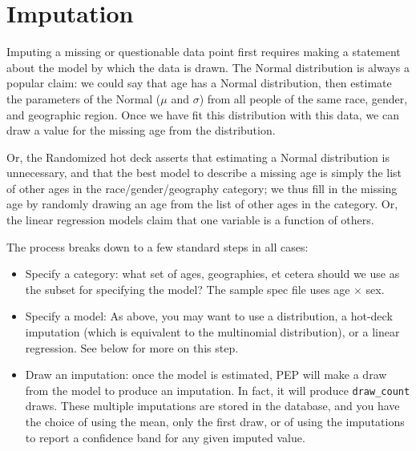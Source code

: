 \documentclass{article}
\begin{document}
\section{Imputation}
Imputing a missing or questionable data point first requires making a statement about
the model by which the data is drawn. The Normal distribution is always a popular claim:
we could say that age has a Normal distribution, then estimate the parameters of the
Normal ($\mu$ and $\sigma$) from all people of the same race, gender, and geographic
region. Once we have fit this distribution with this data, we can draw a value for the missing age
from the distribution.

Or, the Randomized hot deck asserts that estimating a Normal distribution is
unnecessary, and that the best model to describe a missing age is simply the list of
other ages in the race/gender/geography category; we thus fill in the missing age by
randomly drawing an age from the list of other ages in the category. Or, the linear regression models
claim that one variable is a function of others.

The process breaks down to a few standard steps in all cases:

\begin{itemize}
\item Specify a category: what set of ages, geographies, et cetera should we use as the
subset for specifying the model? The sample spec file uses age $\times$ sex.
\item Specify a model: As above, you may want to use a distribution, a hot-deck imputation
(which is equivalent to the multinomial distribution), or a linear regression. See below
for more on this step.
\item Draw an imputation: once the model is estimated, PEP will make a draw from the model to produce an
imputation. In fact, it will produce {\tt draw\_count} draws. These multiple imputations
are stored in the database, and you have the choice of using the mean, only the first
draw, or of using the imputations to report a confidence band for any given imputed value.
\end{itemize}
\end{document}
